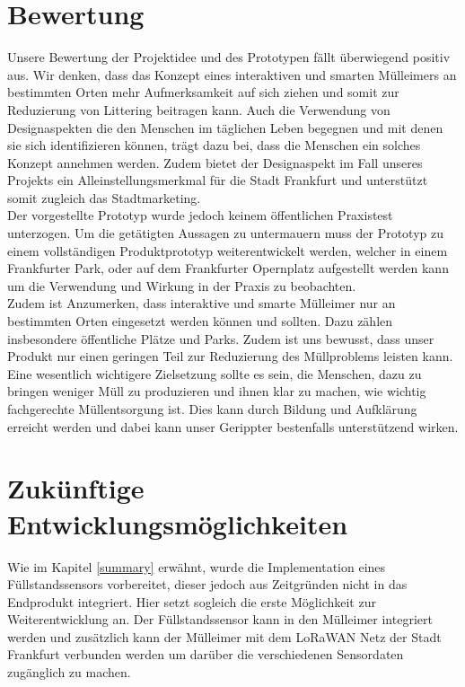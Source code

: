 \chapter{Bewertung}
    Unsere Bewertung der Projektidee und des Prototypen fällt überwiegend positiv aus. Wir denken, dass das Konzept eines interaktiven und smarten Mülleimers an bestimmten Orten mehr Aufmerksamkeit auf sich ziehen und somit zur Reduzierung von Littering beitragen kann. Auch die Verwendung von Designaspekten die den Menschen im täglichen Leben begegnen und mit denen sie sich identifizieren können, trägt dazu bei, dass die Menschen ein solches Konzept annehmen werden. Zudem bietet der Designaspekt im Fall unseres Projekts ein Alleinstellungsmerkmal für die Stadt Frankfurt und unterstützt somit zugleich das Stadtmarketing.\\

    Der vorgestellte Prototyp wurde jedoch keinem öffentlichen Praxistest unterzogen. Um die getätigten Aussagen zu untermauern muss der Prototyp zu einem vollständigen Produktprototyp weiterentwickelt werden, welcher in einem Frankfurter Park, oder auf dem Frankfurter Opernplatz aufgestellt werden kann um die Verwendung und Wirkung in der Praxis zu beobachten.\\

    Zudem ist Anzumerken, dass interaktive und smarte Mülleimer nur an bestimmten Orten eingesetzt werden können und sollten. Dazu zählen insbesondere öffentliche Plätze und Parks. Zudem ist uns bewusst, dass unser Produkt nur einen geringen Teil zur Reduzierung des Müllproblems leisten kann. Eine wesentlich wichtigere Zielsetzung sollte es sein, die Menschen, dazu zu bringen weniger Müll zu produzieren und ihnen klar zu machen, wie wichtig fachgerechte Müllentsorgung ist. Dies kann durch Bildung und Aufklärung erreicht werden und dabei kann unser Gerippter bestenfalls unterstützend wirken.


\chapter{Zukünftige Entwicklungsmöglichkeiten}
    Wie im Kapitel \ref{summary} erwähnt, wurde die Implementation eines Füllstandssensors vorbereitet, dieser jedoch aus Zeitgründen nicht in das Endprodukt integriert. Hier setzt sogleich die erste Möglichkeit zur Weiterentwicklung an. Der Füllstandssensor kann in den Mülleimer integriert werden und zusätzlich kann der Mülleimer mit dem LoRaWAN Netz der Stadt Frankfurt verbunden werden um darüber die verschiedenen Sensordaten zugänglich zu machen.\\


